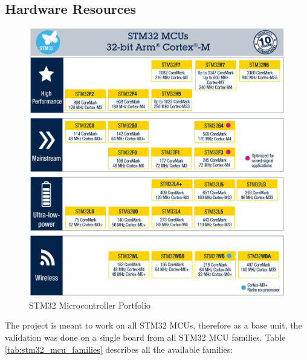 \subsection{Hardware Resources}
\begin{figure}[H]
	\centering
	\includegraphics[width=15cm]{img/ST_Summer_Internship/arm_cortex_mcu_portfolio.png}
	\caption{STM32 Microcontroller Portfolio}
	\label{fig:stm32_portfolio}
\end{figure}
The project is meant to work on all STM32 MCUs, therefore as a base unit, the validation was done on a single board from all STM32 MCU families.
Table \ref{tab:stm32_mcu_families} describes all the available families:
